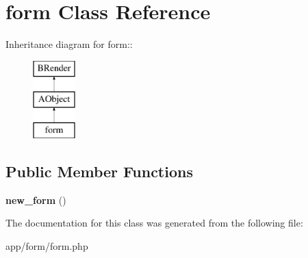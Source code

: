 \section{form Class Reference}
\label{classform}
Inheritance diagram for form::\begin{figure}[H]
\begin{center}
\leavevmode
\includegraphics[height=3cm]{classform}
\end{center}
\end{figure}
\subsection*{Public Member Functions}
\begin{DoxyCompactItemize}
\item 
{\bfseries new\_\-form} ()\label{classform_a77cc2d06b0fe74c7f6e7c6ccf98c8eca}

\end{DoxyCompactItemize}


The documentation for this class was generated from the following file:\begin{DoxyCompactItemize}
\item 
app/form/form.php\end{DoxyCompactItemize}
